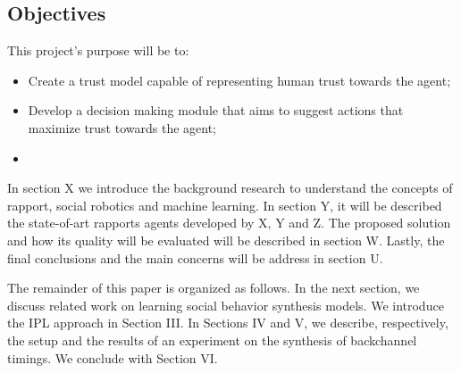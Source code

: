 \subsection{Objectives}
\label{subsec:Objectives}

This project's purpose will be to:
\begin{itemize}
	\item Create a trust model capable of representing human trust towards the agent;
	\item Develop a decision making module that aims to suggest actions that maximize trust towards the agent;
	\item 
\end{itemize}





In section X we introduce the background research to understand the concepts of rapport, social robotics and machine learning. In section Y, it will be described the state-of-art rapports agents developed by X, Y and Z. The proposed solution and how its quality will be evaluated will be described in section W. Lastly, the final conclusions and the main concerns will be address in section U.

The remainder of this paper is organized as follows. In
the next section, we discuss related work on learning social behavior synthesis models. We introduce the IPL approach in Section III. In Sections IV and V, we describe, respectively, the setup and the results of an experiment on the synthesis of backchannel timings. We conclude with Section VI.
